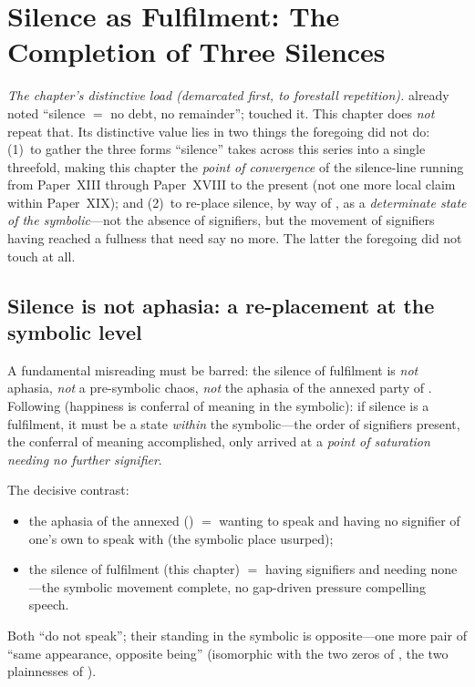 \section{Silence as Fulfilment: The Completion of Three Silences}
\label{p19:sec:silence}

\noindent
\emph{The chapter's distinctive load (demarcated first, to forestall repetition).}  already noted ``silence $=$ no debt, no remainder'';  touched it. This chapter does \emph{not} repeat that. Its distinctive value lies in two things the foregoing did not do: (1)~to gather the three forms ``silence'' takes across this series into a single threefold, making this chapter the \emph{point of convergence} of the silence-line running from Paper~XIII through Paper~XVIII to the present (not one more local claim within Paper~XIX); and (2)~to re-place silence, by way of , as a \emph{determinate state of the symbolic}---not the absence of signifiers, but the movement of signifiers having reached a fullness that need say no more. The latter the foregoing did not touch at all.

\subsection{Silence is not aphasia: a re-placement at the symbolic level}
\label{p19:sub:silence-notaphasia}

A fundamental misreading must be barred: the silence of fulfilment is \emph{not} aphasia, \emph{not} a pre-symbolic chaos, \emph{not} the aphasia of the annexed party of . Following  (happiness is conferral of meaning in the symbolic): if silence is a fulfilment, it must be a state \emph{within} the symbolic---the order of signifiers present, the conferral of meaning accomplished, only arrived at a \emph{point of saturation needing no further signifier}.

The decisive contrast:
\begin{itemize}
  \item the aphasia of the annexed () $=$ wanting to speak and having no signifier of one's own to speak with (the symbolic place usurped);
  \item the silence of fulfilment (this chapter) $=$ having signifiers and needing none---the symbolic movement complete, no gap-driven pressure compelling speech.
\end{itemize}
Both ``do not speak''; their standing in the symbolic is opposite---one more pair of ``same appearance, opposite being'' (isomorphic with the two zeros of , the two plainnesses of ).

